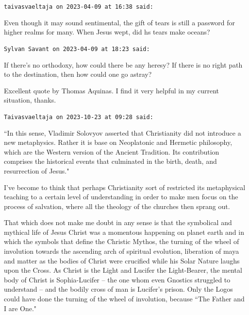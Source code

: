 \begin{footnotesize}\begin{sffamily}



\texttt{taivasvaeltaja on 2023-04-09 at 16:38 said: }

Even though it may sound sentimental, the gift of tears is still a password for higher realms for many. When Jesus wept, did hs tears make oceans?


\hfill

\texttt{Sylvan Savant on 2023-04-09 at 18:23 said: }

If there's no orthodoxy, how could there be any heresy? If there is no right path to the destination, then how could one go astray? 

Excellent quote by Thomas Aquinas. I find it very helpful in my current situation, thanks.


\hfill

\texttt{Taivasvaeltaja on 2023-10-23 at 09:28 said: }

``In this sense, Vladimir Solovyov asserted that Christianity did not introduce a new metaphysics. Rather it is base on Neoplatonic and Hermetic philosophy, which are the Western version of the Ancient Tradition. Its contribution comprises the historical events that culminated in the birth, death, and resurrection of Jesus."

I've become to think that perhaps Christianity sort of restricted its metaphysical teaching to a certain level of understanding in order to make men focus on the process of salvation, where all the theology of the churches then sprang out.

That which does not make me doubt in any sense is that the symbolical and mythical life of Jesus Christ was a momentous happening on planet earth and in which the symbols that define the Christic Mythos, the turning of the wheel of involution towards the ascending arch of spiritual evolution, liberation of maya and matter as the bodies of Christ were crucified while his Solar Nature laughs upon the Cross. As Christ is the Light and Lucifer the Light-Bearer, the mental body of Christ is Sophia-Lucifer – the one whom even Gnostics struggled to understand – and the bodily cross of man is Lucifer's prison. Only the Logos could have done the turning of the wheel of involution, because ``The Father and I are One."


\end{sffamily}\end{footnotesize}
